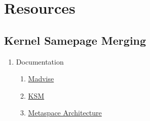 \section{Resources}

\subsection{Kernel Samepage Merging}

\begin{enumerate}
\item Documentation
  \begin{enumerate}
  \item \href{http://man7.org/linux/man-pages/man2/madvise.2.html}{Madvise}
  \item \href{https://www.kernel.org/doc/Documentation/vm/ksm.txt}{KSM}
  \item \href{https://stuefe.de/posts/metaspace/metaspace-architecture/}{Metaspace Architecture}
  \end{enumerate}
  
\end{enumerate}

    
    


